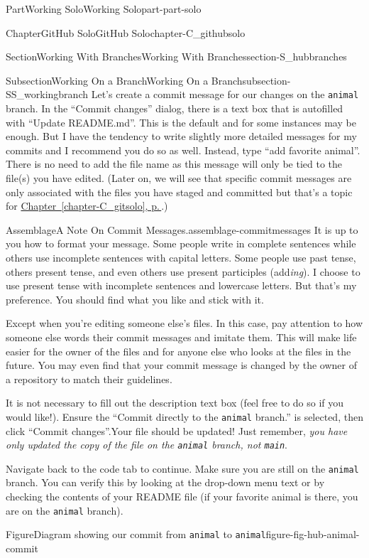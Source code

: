 \documentclass[twoside,10pt,]{book}
\newcommand{\xreffont}{\relax}
\newcommand{\mono}[1]{\texttt{#1}}
\begin{document}
\begin{partptx}{Part}{Working Solo}{}{Working Solo}{}{}{part-part-solo}
\begin{chapterptx}{Chapter}{GitHub Solo}{}{GitHub Solo}{}{}{chapter-C_githubsolo}
\begin{sectionptx}{Section}{Working With Branches}{}{Working With Branches}{}{}{section-S_hubbranches}
\begin{subsectionptx}{Subsection}{Working On a Branch}{}{Working On a Branch}{}{}{subsection-SS_workingbranch}
Let's create a commit message for our changes on the \mono{animal} branch. In the ``Commit changes'' dialog, there is a text box that is autofilled with ``Update README.md''. This is the default and for some instances may be enough. But I have the tendency to write slightly more detailed messages for my commits and I recommend you do so as well. Instead, type ``add favorite animal''. There is no need to add the file name as this message will only be tied to the file(s) you have edited. (Later on, we will see that specific commit messages are only associated with the files you have staged and committed but that's a topic for \hyperref[chapter-C_gitsolo]{Chapter~{\xreffont\ref{chapter-C_gitsolo}}, p.\,\pageref{chapter-C_gitsolo}}.)%
\begin{assemblage}{Assemblage}{A Note On Commit Messages.}{assemblage-commitmessages}%
It is up to you how to format your message. Some people write in complete sentences while others use incomplete sentences with capital letters. Some people use past tense, others present tense, and even others use present participles (add\emph{ing}). I choose to use present tense with incomplete sentences and lowercase letters. But that's my preference. You should find what you like and stick with it.%
\par
\textellipsis{}Except when you're editing someone else's files. In this case, pay attention to how someone else words their commit messages and imitate them. This will make life easier for the owner of the files and for anyone else who looks at the files in the future. You may even find that your commit message is changed by the owner of a repository to match their guidelines.%
\end{assemblage}
It is not necessary to fill out the description text box (feel free to do so if you would like!). Ensure the ``Commit directly to the \mono{animal} branch.'' is selected, then click ``Commit changes''.Your file should be updated! Just remember, \emph{you have only updated the copy of the file on the \mono{animal} branch, not \mono{main}}.%
\par
Navigate back to the code tab to continue. Make sure you are still on the \mono{animal} branch. You can verify this by looking at the drop-down menu text or by checking the contents of your README file (if your favorite animal is there, you are on the \mono{animal} branch).%
\begin{figureptx}{Figure}{Diagram showing our commit from \mono{animal} to \mono{animal}}{figure-fig-hub-animal-commit}{}%
\begin{image}{0.05}{0.9}{0.05}{}%

\end{image}
\end{figureptx}
\end{subsectionptx}
\end{sectionptx}
\end{chapterptx}
\end{partptx}
\end{document}
